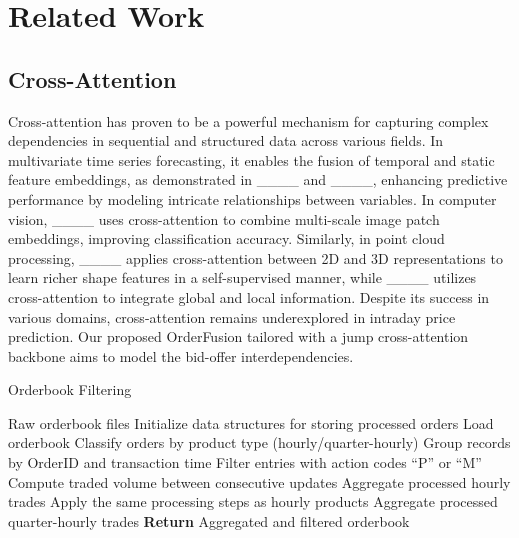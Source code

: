 \section{Related Work}
\label{sec:relatedwork}

\subsection{Cross-Attention}

Cross-attention has proven to be a powerful mechanism for capturing complex dependencies in sequential and structured data across various fields. In multivariate time series forecasting, it enables the fusion of temporal and static feature embeddings, as demonstrated in ____ and  ____, enhancing predictive performance by modeling intricate relationships between variables. In computer vision, ____ uses cross-attention to combine multi-scale image patch embeddings, improving classification accuracy. Similarly, in point cloud processing, ____ applies cross-attention between 2D and 3D representations to learn richer shape features in a self-supervised manner, while ____ utilizes cross-attention to integrate global and local information. Despite its success in various domains, cross-attention remains underexplored in intraday price prediction. Our proposed OrderFusion tailored with a jump cross-attention backbone aims to model the bid-offer interdependencies. 

\begin{algorithm}[tb]
   \caption{Orderbook Filtering}
   \label{alg:orderbookfiltering}
\begin{algorithmic}
    Raw orderbook files
   \STATE Initialize data structures for storing processed orders
      \STATE Load orderbook
      \STATE Classify orders by product type (hourly/quarter-hourly)
         \STATE Group records by OrderID and transaction time
         \STATE Filter entries with action codes ``P'' or ``M'' 
         \STATE Compute traded volume between consecutive updates
         \STATE Aggregate processed hourly trades
      \ENDIF
         \STATE Apply the same processing steps as hourly products
         \STATE Aggregate processed quarter-hourly trades
      \ENDIF
   \ENDFOR
   \STATE \textbf{Return} Aggregated and filtered orderbook
\end{algorithmic}
\end{algorithm}





